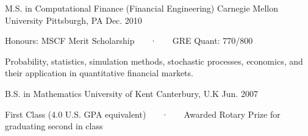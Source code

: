 \begin{cventries}
  \cventry
    {M.S. in Computational Finance (Financial Engineering)}
    {Carnegie Mellon University}
    {Pittsburgh, PA}
    {Dec. 2010}
    {
      \begin{cvitems}
        \item {Honours: MSCF Merit Scholarship ~~~·~~~ GRE Quant: 770/800}
        \item {Probability, statistics, simulation methods, stochastic processes, economics, and their application in quantitative financial markets.}
      \end{cvitems}
    }  
  \cventry
    {B.S. in Mathematics}
    {University of Kent}
    {Canterbury, U.K}
    {Jun. 2007}
    {
      \begin{cvitems}
        \item {First Class (4.0 U.S. GPA equivalent) ~~~·~~~ Awarded Rotary Prize for graduating second in class}
      \end{cvitems}
    }
\end{cventries}
